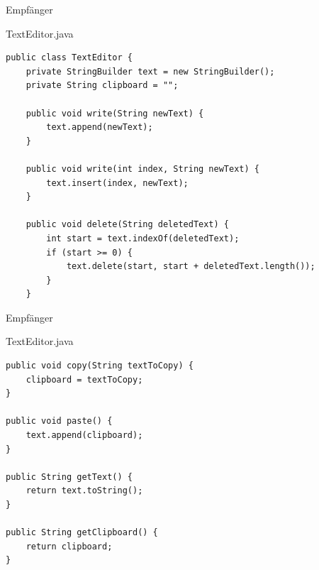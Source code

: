 \begin{frame}[fragile]{Empfänger}
	\begin{exampleblock}{TextEditor.java}
 		\begin{lstlisting}
public class TextEditor {
    private StringBuilder text = new StringBuilder();
    private String clipboard = "";

    public void write(String newText) {
        text.append(newText);
    }
    
    public void write(int index, String newText) {
    	text.insert(index, newText);
    }

    public void delete(String deletedText) {
    	int start = text.indexOf(deletedText);
    	if (start >= 0) {
    		text.delete(start, start + deletedText.length());
    	}
    }
 		\end{lstlisting}
 	\end{exampleblock}
\end{frame}

\begin{frame}[fragile]{Empfänger}
	\begin{exampleblock}{TextEditor.java}
 		\begin{lstlisting}
public void copy(String textToCopy) {
    clipboard = textToCopy;
}

public void paste() {
    text.append(clipboard);
}

public String getText() {
    return text.toString();
}

public String getClipboard() {
    return clipboard;
}
 		\end{lstlisting}
 	\end{exampleblock}
\end{frame}


